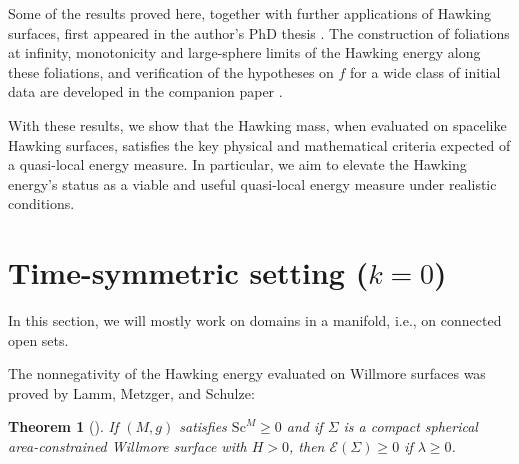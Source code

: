 \documentclass[12pt,a4paper]{amsart}
\theoremstyle{plain}
\newtheorem{theorem}{Theorem}[section]
\theoremstyle{definition}
\begin{document}
Some of the results proved here, together with further applications of Hawking surfaces, first appeared in the author’s PhD thesis \cite{PenuelaThesis}. The construction of foliations at infinity, monotonicity and large-sphere limits of the Hawking energy along these foliations, and verification of the hypotheses on $f$ for a wide class of initial data are developed in the companion paper \cite{penuelafol}.



With these results, we show that the Hawking mass, when evaluated on spacelike Hawking surfaces, satisfies the key physical and mathematical criteria expected of a quasi-local energy measure. In particular, we aim to elevate the Hawking energy’s status as a viable and useful quasi-local energy measure under realistic conditions.



\section{Time-symmetric setting (\texorpdfstring{$k=0$}))}\label{sectiontime}
In this section, we will mostly work on domains in a manifold, i.e., on connected open sets.

The nonnegativity of the Hawking energy evaluated on Willmore surfaces was proved by Lamm, Metzger, and Schulze:
\begin{theorem}[{\cite[Theorem 4]{willflat}}]\label{theo4willfla}
    If \((M, g)\) satisfies \( \mathrm{Sc}^M \geq 0 \) and if \( \Sigma \) is a compact spherical area-constrained Willmore surface  with \( H > 0 \), then \( \mathcal{E} (\Sigma) \geq 0 \) if \( \lambda \geq 0 \).
\end{theorem}
\end{document}
